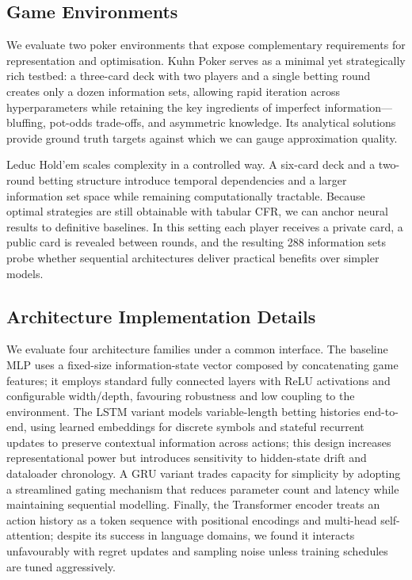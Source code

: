 \documentclass[10pt,twocolumn]{article}
\theoremstyle{definition}
\begin{document}
\subsection{Game Environments}

We evaluate two poker environments that expose complementary requirements for representation and optimisation. Kuhn Poker serves as a minimal yet strategically rich testbed: a three-card deck with two players and a single betting round creates only a dozen information sets, allowing rapid iteration across hyperparameters while retaining the key ingredients of imperfect information—bluffing, pot-odds trade-offs, and asymmetric knowledge. Its analytical solutions provide ground truth targets against which we can gauge approximation quality.

Leduc Hold'em scales complexity in a controlled way. A six-card deck and a two-round betting structure introduce temporal dependencies and a larger information set space while remaining computationally tractable. Because optimal strategies are still obtainable with tabular CFR, we can anchor neural results to definitive baselines. In this setting each player receives a private card, a public card is revealed between rounds, and the resulting 288 information sets probe whether sequential architectures deliver practical benefits over simpler models.

\subsection{Architecture Implementation Details}

We evaluate four architecture families under a common interface. The baseline MLP uses a fixed-size information-state vector composed by concatenating game features; it employs standard fully connected layers with ReLU activations and configurable width/depth, favouring robustness and low coupling to the environment. The LSTM variant models variable-length betting histories end-to-end, using learned embeddings for discrete symbols and stateful recurrent updates to preserve contextual information across actions; this design increases representational power but introduces sensitivity to hidden-state drift and dataloader chronology. A GRU variant trades capacity for simplicity by adopting a streamlined gating mechanism that reduces parameter count and latency while maintaining sequential modelling. Finally, the Transformer encoder treats an action history as a token sequence with positional encodings and multi-head self-attention; despite its success in language domains, we found it interacts unfavourably with regret updates and sampling noise unless training schedules are tuned aggressively.
\end{document}
